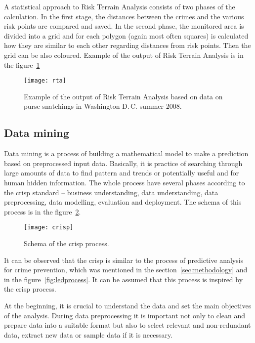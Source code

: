 \documentclass[thesis=M,english]{FITthesis}[2012/10/20]
\begin{document}
A statistical approach to Risk Terrain Analysis\cite[52]{PP13} consists of two phases of the calculation. In the first stage, the distances between the crimes and the various risk points are compared and saved. In the second phase, the monitored area is divided into a grid and for each polygon (again most often squares) is calculated how they are similar to each other regarding distances from risk points. Then the grid can be also coloured. Example of the output of Risk Terrain Analysis is in the figure~\ref{fig:rta}

\vspace*{0.5cm}
\begin{figure}[ht]\centering
    \texttt{[image: rta]}
    \caption{Example of the output of Risk Terrain Analysis based on data on purse snatchings in Washington D.\,C. summer 2008.\cite[54]{PP13}}\label{fig:rta}
\end{figure}

\subsection{Data mining}\label{sec:datamining}

Data mining is a process of building a mathematical model to make a prediction based on preprocessed input data. Basically, it is practice of searching through large amounts of data to find pattern and trends or potentially useful and for human hidden information.\cite[33--34]{PP13} The whole process have several phases according to the \gls{crisp} standard -- business understanding, data understanding, data preprocessing, data modelling, evaluation and deployment.\cite[10]{Chapman2000crisp} The schema of this process is in the figure~\ref{fig:crisp}.

\begin{figure}[ht]\centering
    \texttt{[image: crisp]}
    \caption{Schema of the \gls{crisp} process.\cite[4]{Chapman2000crisp}}\label{fig:crisp}
\end{figure}

It can be observed that the \gls{crisp} is similar to the process of predictive analysis for crime prevention, which was mentioned in the section~\ref{sec:methodology} and in the figure~\ref{fig:ledprocess}. It can be assumed that this process is inspired by the \gls{crisp} process. 

At the beginning, it is crucial to understand the data and set the main objectives of the analysis. During data preprocessing it is important not only to clean and prepare data into a suitable format but also to select relevant and non-redundant data, extract new data or sample data if it is necessary. 
\end{document}
